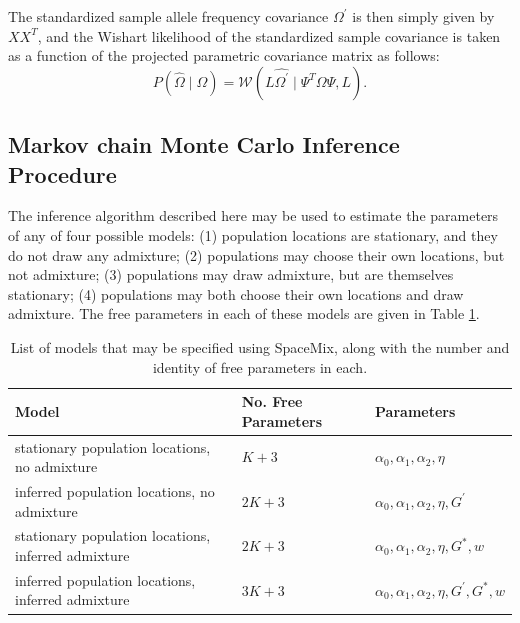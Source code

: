 \documentclass[12pt]{article}
\newcommand{\identifyadmixsource}[1]{{#1^{*}}}
\begin{document}
%
The standardized sample allele frequency covariance $\Omega^{\prime}$ is then simply given by $XX^{T}$, and the Wishart likelihood of the standardized sample covariance is taken as a function of the projected parametric covariance matrix as follows:
%
\begin{equation}
\label{eq:projected_wishart_dist}
P(\widehat{\Omega} \mid \Omega) = \mathcal{W}\left(L \widehat{\Omega^{\prime}} \mid  \Psi^{T}   \Omega   \Psi,L \right) \text{.}
\end{equation}
%

\subsection*{Markov chain Monte Carlo Inference Procedure}
The inference algorithm described here may be used to estimate the parameters of any of four possible models: (1) population locations are stationary, and they do not draw any admixture; (2) populations may choose their own locations, but not admixture; (3) populations may draw admixture, but are themselves stationary; (4) populations may both choose their own locations and draw admixture.  The free parameters in each of these models are given in Table \ref{tab:model_options}.

\begin{centering}
\begin{table}
\begin{tabular}{| >{\centering\arraybackslash}m{6cm} | >{\centering\arraybackslash}m{3cm} | l |}
	\hline
	\textbf{Model} & \textbf{No. Free Parameters} & \textbf{Parameters}\\ \hline
	stationary population locations, no admixture & $K + 3$	& $\alpha_0,\alpha_1,\alpha_2,\eta$	\\ \hline
	inferred population locations, \hspace{0.5cm}no admixture & $2K + 3$	& $\alpha_0,\alpha_1,\alpha_2,\eta,G^{\prime}$	\\ \hline
	stationary population locations, inferred admixture & $2K + 3$	& $\alpha_0,\alpha_1,\alpha_2,\eta,\identifyadmixsource{G},w$	\\ \hline
	inferred population locations, inferred admixture & $3K + 3$	&$\alpha_0,\alpha_1,\alpha_2,\eta,G^{\prime},\identifyadmixsource{G},w$	\\
	\hline
\end{tabular}
\caption{List of models that may be specified using SpaceMix, along with the number and identity of free parameters in each.}\label{tab:model_options}
\end{table}
\end{centering}
\end{document}
